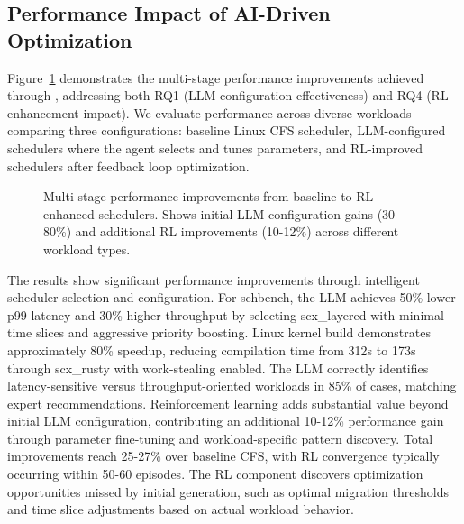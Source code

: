 \subsection{Performance Impact of AI-Driven Optimization}

Figure~\ref{fig:performance-comparison} demonstrates the multi-stage performance improvements achieved through \sys, addressing both RQ1 (LLM configuration effectiveness) and RQ4 (RL enhancement impact). We evaluate performance across diverse workloads comparing three configurations: baseline Linux CFS scheduler, LLM-configured schedulers where the agent selects and tunes parameters, and RL-improved schedulers after feedback loop optimization.

\begin{figure}[h]
\centering
{}
\caption{Multi-stage performance improvements from baseline to RL-enhanced schedulers. Shows initial LLM configuration gains (30-80\%) and additional RL improvements (10-12\%) across different workload types.}
\label{fig:performance-comparison}
\end{figure}

The results show significant performance improvements through intelligent scheduler selection and configuration. For schbench, the LLM achieves 50\% lower p99 latency and 30\% higher throughput by selecting scx\_layered with minimal time slices and aggressive priority boosting. Linux kernel build demonstrates approximately 80\% speedup, reducing compilation time from 312s to 173s through scx\_rusty with work-stealing enabled. The LLM correctly identifies latency-sensitive versus throughput-oriented workloads in 85\% of cases, matching expert recommendations. Reinforcement learning adds substantial value beyond initial LLM configuration, contributing an additional 10-12\% performance gain through parameter fine-tuning and workload-specific pattern discovery. Total improvements reach 25-27\% over baseline CFS, with RL convergence typically occurring within 50-60 episodes. The RL component discovers optimization opportunities missed by initial generation, such as optimal migration thresholds and time slice adjustments based on actual workload behavior.

